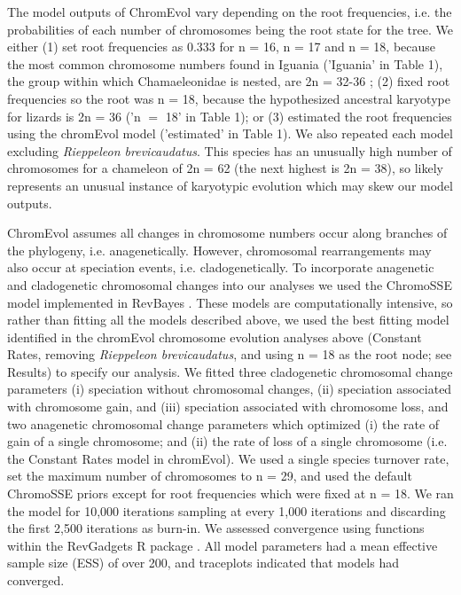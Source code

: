\documentclass[a4paper, 12pt]{article}
\begin{document}
The model outputs of ChromEvol vary depending on the root frequencies, i.e. the probabilities of each number of chromosomes being the root state for the tree. 
We either (1) set root frequencies as 0.333 for n = 16, n = 17 and n = 18, because the most common chromosome numbers found in Iguania ('Iguania' in Table 1), the group within which Chamaeleonidae is nested, are 2n = 32-36 \citep{olmo2005chromorep}; (2) fixed root frequencies so the root was n = 18, because the hypothesized ancestral karyotype for lizards is 2n = 36 \citep{deakin2016anchoring,lisachov2021whole,mezzasalma2021lizards} ('n $=$ 18' in Table 1); or (3) estimated the root frequencies using the chromEvol model ('estimated' in Table 1). 
We also repeated each model excluding \textit{Rieppeleon brevicaudatus}. 
This species has an unusually high number of chromosomes for a chameleon of 2n = 62 (the next highest is 2n = 38), so likely represents an unusual instance of karyotypic evolution which may skew our model outputs. 

ChromEvol assumes all changes in chromosome numbers occur along branches of the phylogeny, i.e. anagenetically. However, chromosomal rearrangements may also occur at speciation events, i.e. cladogenetically. To incorporate anagenetic and cladogenetic chromosomal changes into our analyses we used the ChromoSSE model \citep{freyman2018cladogenetic} implemented in RevBayes \citep{10.1093/sysbio/syw021}. These models are computationally intensive, so rather than fitting all the models described above, we used the best fitting model identified in the chromEvol chromosome evolution analyses above (Constant Rates, removing \textit{Rieppeleon brevicaudatus}, and using n = 18 as the root node; see Results) to specify our analysis. We fitted three cladogenetic chromosomal change parameters (i) speciation without chromosomal changes, (ii) speciation associated with chromosome gain, and (iii) speciation associated with chromosome loss, and two anagenetic chromosomal change parameters which optimized (i) the rate of gain of a single chromosome; and (ii) the rate of loss of a single chromosome (i.e. the Constant Rates model in chromEvol). We used a single species turnover rate, set the maximum number of chromosomes to n = 29, and used the default ChromoSSE priors except for root frequencies which were fixed at n = 18. We ran the model for 10,000 iterations sampling at every 1,000 iterations and discarding the first 2,500 iterations as burn-in. We assessed convergence using functions within the RevGadgets R package \citep{https://doi.org/10.1111/2041-210X.13750}. All model parameters had a mean effective sample size (ESS) of over 200, and traceplots indicated that models had converged.
\end{document}
